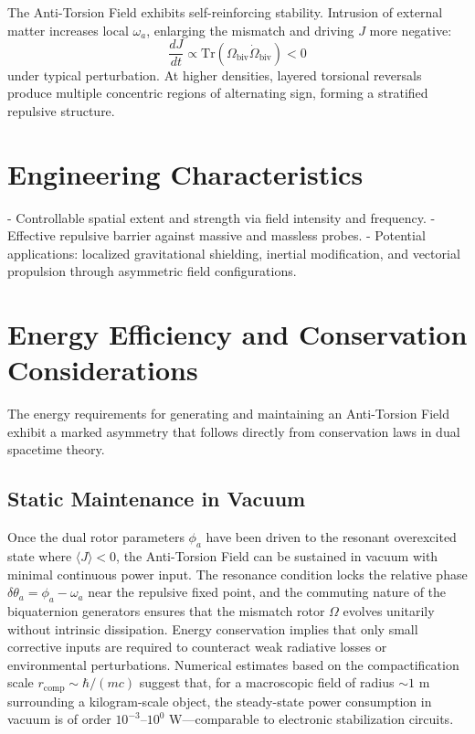 \documentclass[dvipdfmx,11pt,a4paper]{article}
\theoremstyle{definition}
\begin{document}
The Anti-Torsion Field exhibits self-reinforcing stability. Intrusion of external matter increases local $\omega_a$, enlarging the mismatch and driving $J$ more negative:
\[
\frac{dJ}{dt} \propto \mathrm{Tr} \left( \Omega_\text{biv} \dot{\Omega}_\text{biv} \right) < 0
\]
under typical perturbation. At higher densities, layered torsional reversals produce multiple concentric regions of alternating sign, forming a stratified repulsive structure.

\section{Engineering Characteristics}

- Controllable spatial extent and strength via field intensity and frequency.
- Effective repulsive barrier against massive and massless probes.
- Potential applications: localized gravitational shielding, inertial modification, and vectorial propulsion through asymmetric field configurations.

\section{Energy Efficiency and Conservation Considerations}
\label{sec:energy}

The energy requirements for generating and maintaining an Anti-Torsion Field exhibit a marked asymmetry that follows directly from conservation laws in dual spacetime theory.

\subsection{Static Maintenance in Vacuum}
Once the dual rotor parameters $\phi_a$ have been driven to the resonant overexcited state where $\langle J \rangle < 0$, the Anti-Torsion Field can be sustained in vacuum with minimal continuous power input. The resonance condition locks the relative phase $\delta\theta_a = \phi_a - \omega_a$ near the repulsive fixed point, and the commuting nature of the biquaternion generators ensures that the mismatch rotor $\Omega$ evolves unitarily without intrinsic dissipation. Energy conservation implies that only small corrective inputs are required to counteract weak radiative losses or environmental perturbations. Numerical estimates based on the compactification scale $r_\text{comp} \sim \hbar/(mc)$ suggest that, for a macroscopic field of radius $\sim 1$ m surrounding a kilogram-scale object, the steady-state power consumption in vacuum is of order $10^{-3}$--$10^{0}$ W—comparable to electronic stabilization circuits.
\end{document}
